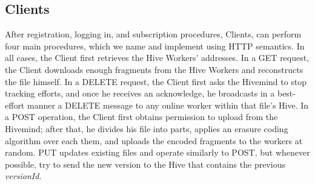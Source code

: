 \documentclass[runningheads]{llncs}
\begin{document}
\subsection{Clients}
After registration, logging in, and subscription procedures, Clients, can perform four main procedures, which we name and implement using HTTP semantics. In all cases, the Client first retrieves the Hive Workers' addresses. In a GET request, the Client downloads enough fragments from the Hive Workers and reconstructs the file himself. In a DELETE request, the Client first asks the Hivemind to stop tracking efforts, and once he receives an acknowledge, he broadcasts in a best-effort manner a DELETE message to any online worker within that file's Hive. In a POST operation, the Client first obtains permission to upload from the Hivemind; after that, he divides his file into parts, applies an erasure coding algorithm over each them, and uploads the encoded fragments to the workers at random. PUT updates existing files and operate similarly to POST, but whenever possible, try to send the new version to the Hive that contains the previous \textit{versionId}.
\end{document}

